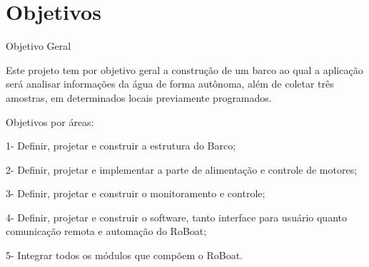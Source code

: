 \section{Objetivos}

Objetivo Geral

Este  projeto  tem  por  objetivo  geral  a  construção  de  um  barco ao qual a aplicação será analisar informações da água de forma autônoma, além de coletar três amostras, em determinados locais previamente programados.

Objetivos por áreas:

1- Definir, projetar e construir a estrutura do Barco;

2- Definir, projetar e implementar a parte de alimentação e controle de motores;

3- Definir, projetar e construir o monitoramento e controle;

4- Definir, projetar e construir o software, tanto interface para usuário quanto comunicação remota e automação do RoBoat;

5- Integrar todos os módulos que compõem o RoBoat.


